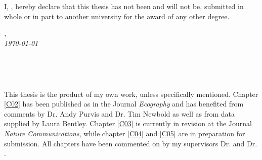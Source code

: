

\vspace*{5cm}

\begin{flushleft}
	\large{\noindent I, \myName, hereby declare that this thesis has not been and will not be, submitted in whole or in part to another university for the award of any other degree.}
\end{flushleft}

\vspace*{2cm}

\begin{minipage}{.45\linewidth}
	\begin{flushleft} %
		\textit{\myLocation,} \\
		\textit{\today}%
	\end{flushleft}
\end{minipage}
\hfill
\begin{minipage}{.45\linewidth}
	\begin{flushright} %
		\makebox[2.5in]{\hrulefill} \\
		\myName 
	\end{flushright}
\end{minipage}\\ [0.5cm]



\vspace*{5cm}

\begin{flushleft}
	\noindent This thesis is the product of my own work, unless specifically mentioned. 
	Chapter \ref{C02} has been published as \cite{Jung2018} in the Journal \textit{Ecography} and has benefited from comments by Dr. Andy Purvis and Dr. Tim Newbold as well as from data supplied by Laura Bentley. Chapter \ref{C03} is currently in revision at the Journal \textit{Nature Communications}, while chapter \ref{C04} and \ref{C05} are in preparation for submission. All chapters have been commented on by my supervisors Dr. \myProf and Dr. \myOtherProf.
	    
\end{flushleft}

